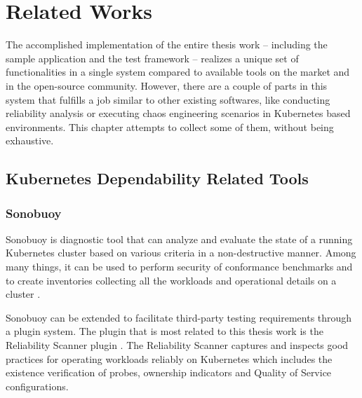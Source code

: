 \chapter{Related Works}

The accomplished implementation of the entire thesis work -- including the sample application and the test framework -- realizes a unique set of functionalities in a single system compared to available tools on the market and in the open-source community. However, there are a couple of parts in this system that fulfills a job similar to other existing softwares, like conducting reliability analysis or executing chaos engineering scenarios in Kubernetes based environments. This chapter attempts to collect some of them, without being exhaustive.

\section{Kubernetes Dependability Related Tools}

\subsection{Sonobuoy}

Sonobuoy is diagnostic tool that can analyze and evaluate the state of a running Kubernetes cluster based on various criteria in a non-destructive manner. Among many things, it can be used to perform security of conformance benchmarks and to create inventories collecting all the workloads and operational details on a cluster \cite{Sonobuoy}.

Sonobuoy can be extended to facilitate third-party testing requirements through a plugin system. The plugin that is most related to this thesis work is the Reliability Scanner plugin \cite{SonobuoyReliabilityScanner}. The Reliability Scanner captures and inspects good practices for operating workloads reliably on Kubernetes which includes the existence verification of  probes, ownership indicators and Quality of Service configurations.

